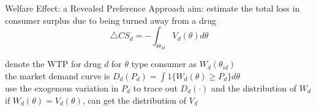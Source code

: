 \begin{frame}{Welfare Effect: a Revealed Preference Approach}
    aim: estimate the total loss in consumer surplus due to being turned away from a drug
    $$\triangle CS_d = -\int_{\Theta_M} V_d(\theta) d\theta $$

    denote the WTP for drug $d$ for $\theta$ type consumer as $W_d(\theta_{id})$ \\
    the market demand curve is $D_d(P_d) =\int 1\{W_d(\theta) \geq P_d \}d \theta $ \\
    use the exogenous variation in $P_d$ to trace out $D_d (\cdot)$ and the distribution of $W_d$ \\
    if $W_d(\theta)=V_d(\theta)$, can get the distribution of $V_d$
\end{frame}
